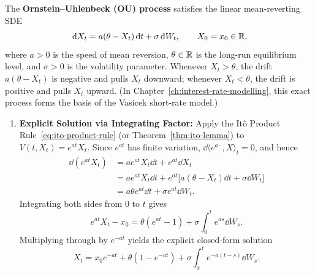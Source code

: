 \begin{example}
\label{ex:ou-process}
The \textbf{Ornstein--Uhlenbeck (OU) process} satisfies the linear mean-reverting SDE
\begin{equation}
\label{eq:ou-sde}
\,\mathrm{d} X_t = a(\theta - X_t)\,\mathrm{d} t + \sigma \,\mathrm{d} W_t, \qquad X_0 = x_0 \in \mathbb{R},
\end{equation}
where $a > 0$ is the speed of mean reversion, $\theta \in \mathbb{R}$ is the long-run equilibrium level, and $\sigma > 0$ is the volatility parameter. Whenever $X_t > \theta$, the drift $a(\theta - X_t)$ is negative and pulls $X_t$ downward; whenever $X_t < \theta$, the drift is positive and pulls $X_t$ upward. (In Chapter~\ref{ch:interest-rate-modelling}, this exact process forms the basis of the Vasicek short-rate model.)

\begin{enumerate}
    \item \textbf{Explicit Solution via Integrating Factor:} Apply the It\^o Product Rule~\eqref{eq:ito-product-rule} (or Theorem~\ref{thm:ito-lemma}) to $V(t, X_t) = e^{at} X_t$. Since $e^{at}$ has finite variation, $\dd\langle e^{a\cdot}, X \rangle_t = 0$, and hence
    \begin{align*}
    \dd(e^{at} X_t)
    &= a e^{at} X_t \dd t + e^{at}\dd X_t \\
    &= a e^{at} X_t \dd t + e^{at}\big[a(\theta - X_t)\dd t + \sigma \dd W_t\big] \\
    &= a\theta e^{at}\dd t + \sigma e^{at}\dd W_t.
    \end{align*}
    Integrating both sides from $0$ to $t$ gives
    \[
    e^{at} X_t - x_0 = \theta(e^{at} - 1) + \sigma \int_0^t e^{as}\dd W_s.
    \]
    Multiplying through by $e^{-at}$ yields the explicit closed-form solution
    \begin{equation}
    \label{eq:ou-solution}
    X_t = x_0 e^{-at} + \theta(1 - e^{-at}) + \sigma \int_0^t e^{-a(t-s)}\dd W_s.
    \end{equation}


\end{enumerate}
\end{example}
